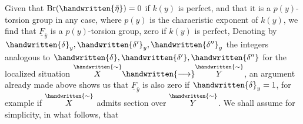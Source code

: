 Given that $\mathrm{Br}(\handwritten{\tilde\eta})=0$ if $k(y)$ is perfect, and that it is a $p(y)$-torsion group in any case, where $p(y)$ is the charaeristic exponent of $k(y)$, we find that $\underline F_{\bar y}$ is a $p(y)$-torsion group, zero if $k(y)$ is perfect, Denoting by $\handwritten{\delta}_{y},\handwritten{\delta'}_{y},\handwritten{\delta''}_{y}$ the integers analogous to $\handwritten{\delta},\handwritten{\delta'},\handwritten{\delta''}$ for the localized situation $\overset{\handwritten{\sim}}{X}\handwritten{\longrightarrow}\overset{\handwritten{\sim}}{Y}$, an argument already  made above shows us that $\underline F_{\bar y}$  is also zero if $\handwritten{\delta}_{y}=1$, for example if $\overset{\handwritten{\sim}}{X}$ admits  section over $\overset{\handwritten{\sim}}{Y}$. We shall assume for simplicity, in what follows, that
\clearpage
